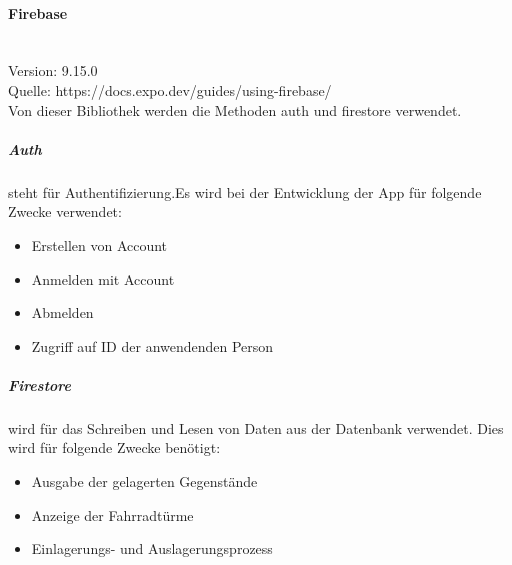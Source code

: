 \paragraph{Firebase}\mbox{}\\
Version: 9.15.0\\
Quelle: https://docs.expo.dev/guides/using-firebase/\\
Von dieser Bibliothek werden die Methoden auth und firestore verwendet.
\subparagraph{Auth}steht für Authentifizierung.Es wird bei der Entwicklung der App für folgende Zwecke verwendet: \\
\begin{itemize}
    \item Erstellen von Account
    \item Anmelden mit Account
    \item Abmelden
    \item Zugriff auf ID der anwendenden Person
\end{itemize}

\subparagraph{Firestore}wird für das Schreiben und Lesen von Daten aus der Datenbank verwendet. Dies wird für folgende Zwecke benötigt:\\
\begin{itemize}
    \item Ausgabe der gelagerten Gegenstände
    \item Anzeige der Fahrradtürme
    \item Einlagerungs- und Auslagerungsprozess
\end{itemize}

